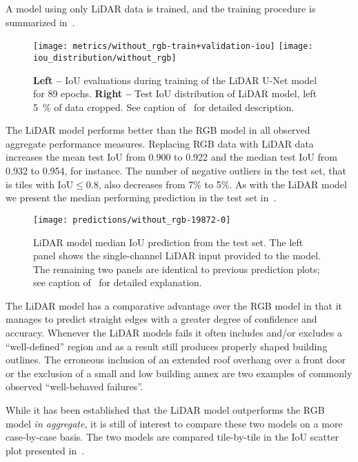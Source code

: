 A model using only LiDAR data is trained, and the training procedure is summarized in~.
\begin{figure}[H]
  \centering
  \texttt{[image: metrics/without\_rgb-train+validation-iou]}
  \texttt{[image: iou\_distribution/without\_rgb]}
  \caption{%
    \textbf{Left --} IoU evaluations during training of the LiDAR U-Net model for 89 epochs.
    \textbf{Right --} Test IoU distribution of LiDAR model, left \SI{5}{\percent} of data cropped.
    See caption of~ for detailed description.
  }%
  \label{fig:lidar-training}
\end{figure}

The LiDAR model performs better than the RGB model in all observed aggregate performance measures.
Replacing RGB data with LiDAR data increases the mean test IoU from 0.900 to 0.922 and the median test IoU from 0.932 to 0.954, for instance.
The number of negative outliers in the test set, that is tiles with $\mathrm{IoU} \leq 0.8$, also decreases from 7\% to 5\%.
As with the LiDAR model we present the median performing prediction in the test set in~.

\begin{figure}[H]
  \centering
  \texttt{[image: predictions/without\_rgb-19872-0]}  %
  \caption{%
    LiDAR model median IoU prediction from the test set.
    The left panel shows the single-channel LiDAR input provided to the model.
    The remaining two panels are identical to previous prediction plots; see caption of~ for detailed explanation.
  }%
  \label{fig:lidar-median-prediction}
\end{figure}

The LiDAR model has a comparative advantage over the RGB model in that it manages to predict straight edges with a greater degree of confidence and accuracy.
Whenever the LiDAR models fails it often includes and/or excludes a \enquote{well-defined} region and as a result still produces properly shaped building outlines.
The erroneous inclusion of an extended roof overhang over a front door or the exclusion of a small and low building annex are two examples of commonly observed \enquote{well-behaved failures}.

While it has been established that the LiDAR model outperforms the RGB model \emph{in aggregate}, it is still of interest to compare these two models on a more case-by-case basis.
The two models are compared tile-by-tile in the IoU scatter plot presented in~.

